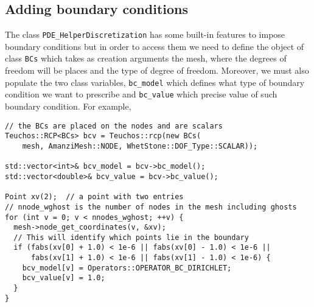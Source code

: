 \subsection{Adding boundary conditions}\label{Sec:AddingBoundaryCond}
The class {\tt PDE\_HelperDiscretization} has some built-in features to impose boundary conditions 
but in order to access them we need to define the object of class {\tt BCs} which takes as 
creation arguments the mesh, where the degrees of freedom will be places and the type of degree 
of freedom. 
Moreover, we must also populate the two class variables, {\tt bc\_model} which defines what 
type of boundary condition we want to prescribe and {\tt bc\_value} which precise value of such 
boundary condition. For example,
%
\begin{lstlisting}
// the BCs are placed on the nodes and are scalars
Teuchos::RCP<BCs> bcv = Teuchos::rcp(new BCs(
    mesh, AmanziMesh::NODE, WhetStone::DOF_Type::SCALAR));

std::vector<int>& bcv_model = bcv->bc_model();
std::vector<double>& bcv_value = bcv->bc_value();

Point xv(2);  // a point with two entries
// nnode_wghost is the number of nodes in the mesh including ghosts
for (int v = 0; v < nnodes_wghost; ++v) {
  mesh->node_get_coordinates(v, &xv);
  // This will identify which points lie in the boundary
  if (fabs(xv[0] + 1.0) < 1e-6 || fabs(xv[0] - 1.0) < 1e-6 ||
      fabs(xv[1] + 1.0) < 1e-6 || fabs(xv[1] - 1.0) < 1e-6) {
    bcv_model[v] = Operators::OPERATOR_BC_DIRICHLET;
    bcv_value[v] = 1.0;
  }
}
\end{lstlisting}


